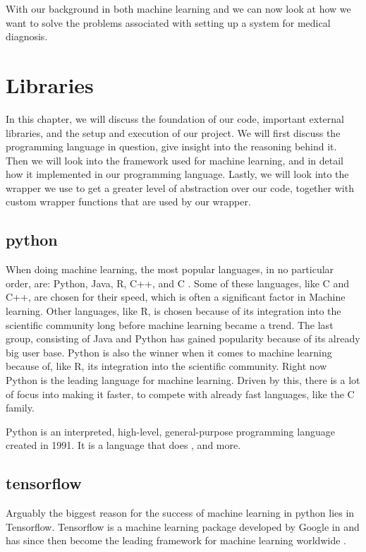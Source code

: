 With our background in both machine learning and  we can now look at how we want to solve the problems associated with setting up a system for medical diagnosis.

    
\section{Libraries}

In this chapter, we will discuss the foundation of our code, important external libraries, and the setup and execution of our project.  
We will first discuss the programming language in question, give insight into the reasoning behind it. Then we will look into the framework used for machine learning, and in detail how it implemented in our programming language. Lastly, we will look into the wrapper we use to get a greater level of abstraction over our code, together with custom wrapper functions that are used by our wrapper. 


    \subsection{python}
    When doing machine learning, the most popular languages, in no particular order, are: Python, Java, R, C++, and C . Some of these languages, like C and C++, are chosen for their speed, which is often a significant factor in Machine learning. Other languages, like R, is chosen because of its integration into the scientific community long before machine learning became a trend. The last group, consisting of Java and Python has gained popularity because of its already big user base. Python is also the winner when it comes to machine learning because of, like R, its integration into the scientific community. 
    Right now Python is the leading language for machine learning. Driven by this, there is a lot of focus into making it faster, to compete with already fast languages, like the C family. 

    Python is an interpreted, high-level, general-purpose programming language created in 1991.   It is a language that does , and more. 

    

    \subsection{tensorflow}
    Arguably the biggest reason for the success of machine learning in python lies in Tensorflow. Tensorflow is a machine learning package developed by Google in  and has since then become the leading framework for machine learning worldwide .  

